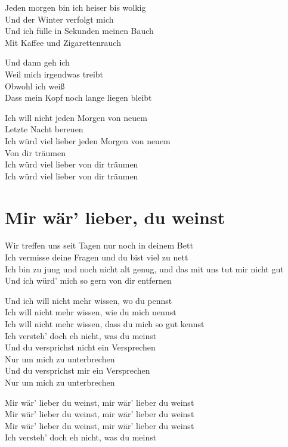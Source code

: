 \documentclass[]{book}
\begin{document}
Jeden morgen bin ich heiser bis wolkig\\
Und der Winter verfolgt mich\\
Und ich fülle in Sekunden meinen Bauch\\
Mit Kaffee und Zigarettenrauch

Und dann geh ich\\
Weil mich irgendwas treibt\\
Obwohl ich weiß\\
Dass mein Kopf noch lange liegen bleibt

Ich will nicht jeden Morgen von neuem\\
Letzte Nacht bereuen\\
Ich würd viel lieber jeden Morgen von neuem\\
Von dir träumen\\
Ich würd viel lieber von dir träumen\\
Ich würd viel lieber von dir träumen

\hypertarget{mir-war-lieber-du-weinst-2}{%
\section{Mir wär' lieber, du weinst}\label{mir-war-lieber-du-weinst-2}}

Wir treffen uns seit Tagen nur noch in deinem Bett\\
Ich vermisse deine Fragen und du bist viel zu nett\\
Ich bin zu jung und noch nicht alt genug, und das mit uns tut mir nicht gut\\
Und ich würd' mich so gern von dir entfernen

Und ich will nicht mehr wissen, wo du pennst\\
Ich will nicht mehr wissen, wie du mich nennst\\
Ich will nicht mehr wissen, dass du mich so gut kennst\\
Ich versteh' doch eh nicht, was du meinst\\
Und du versprichst nicht ein Versprechen\\
Nur um mich zu unterbrechen\\
Und du versprichst mir ein Versprechen\\
Nur um mich zu unterbrechen

Mir wär' lieber du weinst, mir wär' lieber du weinst\\
Mir wär' lieber du weinst, mir wär' lieber du weinst\\
Mir wär' lieber du weinst, mir wär' lieber du weinst\\
Ich versteh' doch eh nicht, was du meinst
\end{document}
